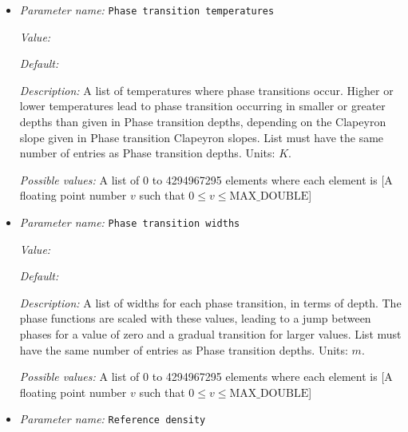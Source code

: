 \begin{itemize}
{\it Value:} 


{\it Default:} 


{\it Description:} A list of pressures where phase transitions occur. Values must monotonically increase. Define transition by depth instead of pressure must be set to false to use this parameter. Units: $Pa$.


{\it Possible values:} A list of 0 to 4294967295 elements where each element is [A floating point number $v$ such that $0 \leq v \leq \text{MAX\_DOUBLE}$]
\item {\it Parameter name:} {\tt Phase transition temperatures}
\label{parameters:Material model/Latent heat/Phase transition temperatures}


{\it Value:} 


{\it Default:} 


{\it Description:} A list of temperatures where phase transitions occur. Higher or lower temperatures lead to phase transition occurring in smaller or greater depths than given in Phase transition depths, depending on the Clapeyron slope given in Phase transition Clapeyron slopes. List must have the same number of entries as Phase transition depths. Units: $K$.


{\it Possible values:} A list of 0 to 4294967295 elements where each element is [A floating point number $v$ such that $0 \leq v \leq \text{MAX\_DOUBLE}$]
\item {\it Parameter name:} {\tt Phase transition widths}
\label{parameters:Material model/Latent heat/Phase transition widths}


{\it Value:} 


{\it Default:} 


{\it Description:} A list of widths for each phase transition, in terms of depth. The phase functions are scaled with these values, leading to a jump between phases for a value of zero and a gradual transition for larger values. List must have the same number of entries as Phase transition depths. Units: $m$.


{\it Possible values:} A list of 0 to 4294967295 elements where each element is [A floating point number $v$ such that $0 \leq v \leq \text{MAX\_DOUBLE}$]
\item {\it Parameter name:} {\tt Reference density}
\label{parameters:Material model/Latent heat/Reference density}



\end{itemize}
